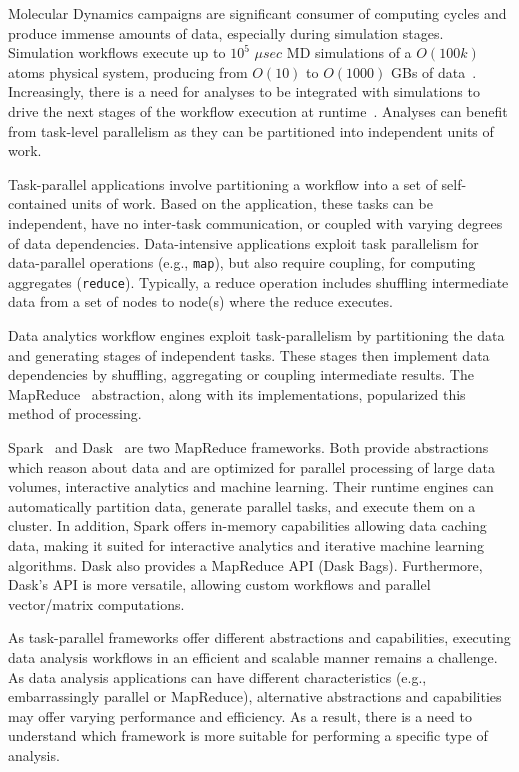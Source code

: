 
Molecular Dynamics campaigns are significant consumer of computing cycles and
produce immense amounts of data, especially during simulation stages. Simulation
workflows execute up to $10^5$ $\mu sec$ MD simulations of a $O(100k)$ atoms
physical system, producing from $O(10)$ to $O(1000)$ GBs of
data~\cite{cheatham2015impact}. Increasingly, there is a need for analyses to be
integrated with simulations to drive the next stages of the workflow execution
at runtime~\cite{balasubramanian2016extasy}. Analyses can benefit from
task-level parallelism as they can be partitioned into independent units of
work.

Task-parallel applications involve partitioning a workflow into a set of
self-contained units of work. Based on the application, these tasks can be
independent, have no inter-task communication, or coupled with varying degrees
of data dependencies. Data-intensive applications exploit task parallelism for
data-parallel operations (e.g., \texttt{map}), but also require coupling, for
computing aggregates (\texttt{reduce}). Typically, a reduce operation includes
shuffling intermediate data from a set of nodes to node(s) where the reduce
executes.

Data analytics workflow engines exploit task-parallelism by partitioning the
data and generating stages of independent tasks. These stages then implement
data dependencies by shuffling, aggregating or coupling intermediate results.
The MapReduce~\cite{dean2004mapreduce} abstraction, along with its
implementations, popularized this method of processing.

Spark~\cite{zaharia2010spark} and Dask~\cite{rocklin2015dask} are two MapReduce
frameworks. Both provide abstractions which reason about data and are optimized
for parallel processing of large data volumes, interactive analytics and machine
learning. Their runtime engines can automatically partition data, generate
parallel tasks, and execute them on a cluster. In addition, Spark offers
in-memory capabilities allowing data caching data, making it suited for
interactive analytics and iterative machine learning algorithms. Dask also
provides a MapReduce API (Dask Bags). Furthermore, Dask's API is more versatile,
allowing custom workflows and parallel vector/matrix computations.

As task-parallel frameworks offer different abstractions and capabilities,
executing data analysis workflows in an efficient and scalable manner remains a
challenge. As data analysis applications can have different characteristics
(e.g., embarrassingly parallel or MapReduce), alternative abstractions and
capabilities may offer varying performance and efficiency. As a result, there is
a need to understand which framework is more suitable for performing a specific
type of analysis.

